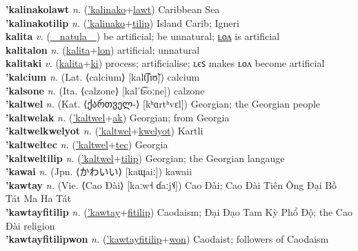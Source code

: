\textbf{'kalinakolawt} \textit{n.} (\hyperref['kalinako]{'kalinako}+\hyperref[lawt]{lawt})
Caribbean Sea \label{'kalinakolawt} \\
\textbf{'kalinakotilip} \textit{n.} (\hyperref['kalinako]{'kalinako}+\hyperref[tilip]{tilip})
Island Carib; Igneri \label{'kalinakotilip} \\
\textbf{kalita} \textit{v.} (\hyperref[natula]{~~natula~~})
be artificial; be unnatural; \hyperref[kalitalon]{ʟᴏᴧ} is artificial \label{kalita} \\
\textbf{kalitalon} \textit{n.} (\hyperref[kalita]{kalita}+\hyperref[lon]{lon})
artificial; unnatural \label{kalitalon} \\
\textbf{kalitaki} \textit{v.} (\hyperref[kalita]{kalita}+\hyperref[ki]{ki})
process; artificialise; ʟєꜱ makes ʟᴏᴧ become artificial \label{kalitaki} \\
\textbf{'kalcium} \textit{n.} (Lat. ⟨calcium⟩ [kalt͡ʃɪʊ̃])
calcium \label{'kalcium} \\
\textbf{'kalsone} \textit{n.} (Ita. ⟨calzone⟩ [kalˈt͡soːne])
calzone \label{'kalsone} \\
\textbf{'kaltwel} \textit{n.} (Kat. ⟨ქართველ-⟩ [kʰɑrtʰvɛl])
Georgian; the Georgian people \label{'kaltwel} \\
\textbf{'kaltwelak} \textit{n.} (\hyperref['kaltwel]{'kaltwel}+\hyperref[ak]{ak})
Georgian; from Georgia \label{'kaltwelak} \\
\textbf{'kaltwelkwelyot} \textit{n.} (\hyperref['kaltwel]{'kaltwel}+\hyperref[kwelyot]{kwelyot})
Kartli \label{'kaltwelkwelyot} \\
\textbf{'kaltweltec} \textit{n.} (\hyperref['kaltwel]{'kaltwel}+\hyperref[tec]{tec})
Georgia \label{'kaltweltec} \\
\textbf{'kaltweltilip} \textit{n.} (\hyperref['kaltwel]{'kaltwel}+\hyperref[tilip]{tilip})
Georgian; the Georgian langauge \label{'kaltweltilip} \\
\textbf{'kawai} \textit{n.} (Jpn. ⟨かわいい⟩ [kaɰaiː])
kawaii \label{'kawai} \\
\textbf{'kawtay} \textit{n.} (Vie. ⟨Cao Đài⟩ [kaːw˧ ɗaːj˦˨])
Cao Đài; Cao Đài Tiên Ông Đại Bồ Tát Ma Ha Tát \label{'kawtay} \\
\textbf{'kawtayfitilip} \textit{n.} (\hyperref['kawtay]{'kawtay}+\hyperref[fitilip]{fitilip})
Caodaism; Đại Đạo Tam Kỳ Phổ Độ; the Cao Đài religion \label{'kawtayfitilip} \\
\textbf{'kawtayfitilipwon} \textit{n.} (\hyperref['kawtayfitilip]{'kawtayfitilip}+\hyperref[won]{won})
Caodaist; followers of Caodaism \label{'kawtayfitilipwon} \\

